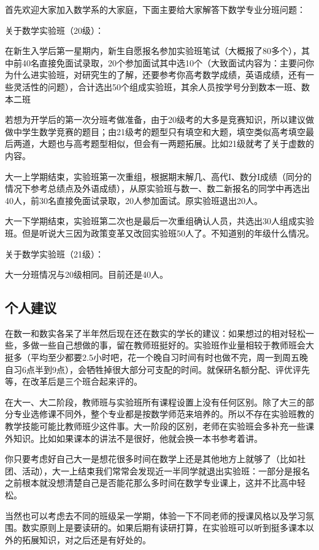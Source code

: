 \documentclass{my_paper}
\begin{document}
首先欢迎大家加入数学系的大家庭，下面主要给大家解答下数学专业分班问题：

关于数学实验班（20级）：

在新生入学后第一星期内，新生自愿报名参加实验班\textcolor[rgb]{1,0,0}{笔试}（大概报了80多个），其中前40名直接免面试录取，20个参加面试其中选10个（大致面试内容为：主要问你为什么进实验班，对研究生的了解，还要参考你高考数学成绩，英语成绩，还有一些灵活性的问题），合计选出50个组成实验班，其余人员按学号分到数本一班、数本二班

\textcolor[rgb]{1,0,0}{若想为开学后的第一次分班考做准备，由于20级考的大多是竞赛知识，所以建议做做中学生数学竞赛的题目；由21级考的题型只有填空和大题，填空类似高考填空最后两道，大题也与高考题型相似，但会有一两题拓展。比如21级就考了关于虚数的内容。}

大一上学期结束，实验班第一次重组，根据期末解几、高代I、数分I成绩（同分的情况下参考总绩点及外语成绩），从原实验班与数一、数二新报名的同学中再选出40人，前30名直接免面试录取，20人参加面试。原实验班退出20人。

大一下学期结束，实验班第二次也是最后一次重组确认人员，共选出30人组成实验班。但是听说大三因为政策变革又改回实验班50人了。不知道别的年级什么情况。

关于数学实验班（21级）： 

大一分班情况与20级相同。目前还是40人。


\subsection{个人建议}
在数一和数实各呆了半年然后现在还在数实的学长的建议：如果想过的相对轻松一些，多做一些自己想做的事，留在教师班挺好的。实验班作业量相较于教师班会大挺多（平均至少都要2.5小时吧，花一个晚自习时间有时也做不完，周一到周五晚自习6点半到9点），会牺牲掉很大部分可支配的时间。\textcolor[rgb]{1,0,0}{就保研名额分配、评优评先等，在改革后是三个班合起来评的。}

在大一、大二阶段，教师班与实验班所有课程设置上\textcolor[rgb]{1,0,0}{没有任何区别}。除了大三的部分专业选修课不同外，整个专业都是按\textcolor[rgb]{1,0,0}{数学师范}来培养的。所以不存在实验班教的教学技能可能比教师班少这件事。大一阶段的区别，老师在实验班会多补充一些课外知识。比如如果课本的讲法不是很好，他就会换一本书参考着讲。

你只要考虑好自己大一是想花很多时间在数学上还是其他地方上就够了（比如社团、活动），大一上结束我们常常会发现近一半同学就退出实验班：一部分是报名之前根本就没想清楚自己是否能花那么多时间在数学专业课上，这并不比高中轻松。

当然也可以考虑去不同的班级呆一学期，体验一下不同老师的授课风格以及学习氛围。数实原则上是要读研的。如果后期有读研打算，在实验班可以听到挺多课本以外的拓展知识，对之后还是有好处的。
\end{document}
